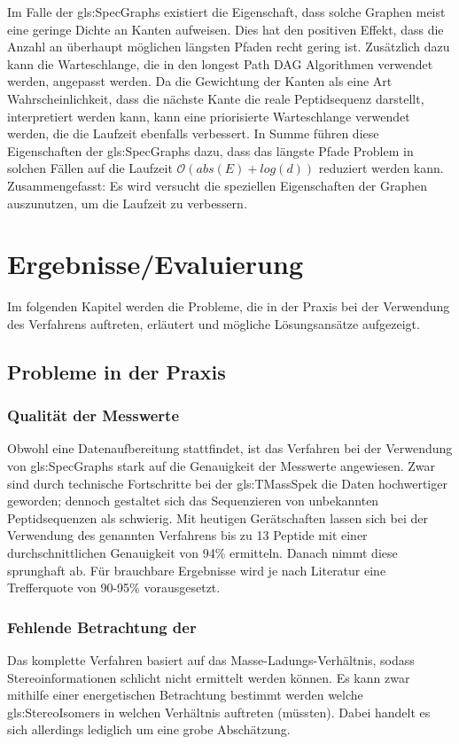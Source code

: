\documentclass[a4paper, 12pt]{article}
\newcommand{\gerquot}[1]{\glqq#1\grqq}
\newcommand{\dashAndSpace}{\textendash \space}
\begin{document}
Im Falle der \glspl{gls:SpecGraph} existiert die Eigenschaft, dass solche Graphen meist eine geringe Dichte an Kanten aufweisen. Dies hat den positiven Effekt, dass die Anzahl an überhaupt möglichen längsten Pfaden recht gering ist. Zusätzlich dazu kann die Warteschlange, die in den longest Path DAG Algorithmen verwendet werden, angepasst werden. Da die Gewichtung der Kanten als eine Art \gerquot{Wahrscheinlichkeit}, dass die nächste Kante die reale Peptidsequenz darstellt, interpretiert werden kann, kann eine priorisierte Warteschlange verwendet werden, die die Laufzeit ebenfalls verbessert. In Summe führen diese Eigenschaften der \glspl{gls:SpecGraph} dazu, dass das längste Pfade Problem in solchen Fällen auf die Laufzeit $\mathcal{O}(abs(E) + log(d))$ reduziert werden kann.\\

Zusammengefasst: Es wird versucht die speziellen Eigenschaften der Graphen auszunutzen, um die Laufzeit zu verbessern.


\section{Ergebnisse/Evaluierung}
Im folgenden Kapitel werden die Probleme, die in der Praxis bei der Verwendung des Verfahrens auftreten, erläutert und mögliche Lösungsansätze aufgezeigt.

\subsection{Probleme in der Praxis}
\subsubsection{Qualität der Messwerte}
Obwohl eine Datenaufbereitung stattfindet, ist das Verfahren bei der Verwendung von \glspl{gls:SpecGraph} stark auf die Genauigkeit der Messwerte angewiesen. Zwar sind durch technische Fortschritte bei der \gls{gls:TMassSpek} die Daten hochwertiger geworden; dennoch gestaltet sich das Sequenzieren von unbekannten Peptidsequenzen als schwierig. Mit heutigen Gerätschaften lassen sich bei der Verwendung des genannten Verfahrens bis zu 13 Peptide mit einer durchschnittlichen Genauigkeit von 94\% ermitteln. Danach nimmt diese sprunghaft ab. Für brauchbare Ergebnisse wird \dashAndSpace je nach Literatur \dashAndSpace eine Trefferquote von 90-95\% vorausgesetzt.
\subsubsection{Fehlende Betrachtung der }\label{FehlendeStereoInfos}
Das komplette Verfahren basiert auf das Masse-Ladungs-Verhältnis, sodass Stereoinformationen schlicht nicht ermittelt werden können. Es kann zwar mithilfe einer energetischen Betrachtung bestimmt werden welche \glspl{gls:StereoIsomer} in welchen Verhältnis auftreten (müssten). Dabei handelt es sich allerdings lediglich um eine grobe Abschätzung.
\end{document}
